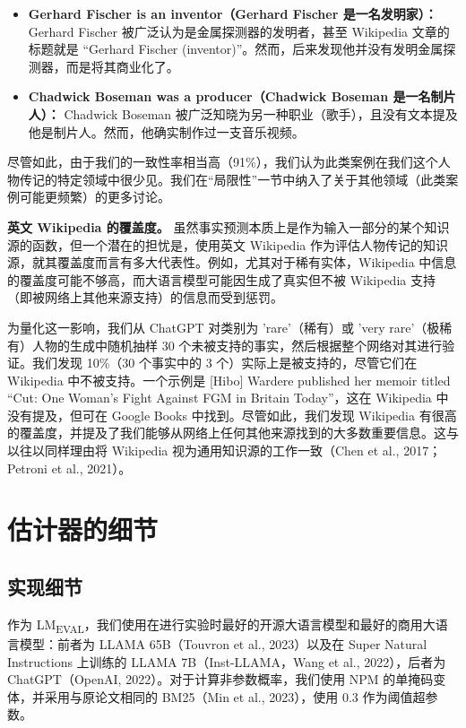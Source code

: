 \documentclass[11pt,UTF8,fontset=fandol]{ctexart}
\newcommand{\eval}{LM\textsubscript{EVAL}}
\begin{document}
\begin{itemize}[leftmargin=2em]
\item \textbf{Gerhard Fischer is an inventor（Gerhard Fischer 是一名发明家）：} Gerhard Fischer 被广泛认为是金属探测器的发明者，甚至 Wikipedia 文章的标题就是 “Gerhard Fischer (inventor)”。然而，后来发现他并没有发明金属探测器，而是将其商业化了。
\item \textbf{Chadwick Boseman was a producer（Chadwick Boseman 是一名制片人）：} Chadwick Boseman 被广泛知晓为另一种职业（歌手），且没有文本提及他是制片人。然而，他确实制作过一支音乐视频。
\end{itemize}

尽管如此，由于我们的一致性率相当高（91\%），我们认为此类案例在我们这个人物传记的特定领域中很少见。我们在“局限性”一节中纳入了关于其他领域（此类案例可能更频繁）的更多讨论。

\textbf{英文 Wikipedia 的覆盖度。} 虽然事实预测本质上是作为输入一部分的某个知识源的函数，但一个潜在的担忧是，使用英文 Wikipedia 作为评估人物传记的知识源，就其覆盖度而言有多大代表性。例如，尤其对于稀有实体，Wikipedia 中信息的覆盖度可能不够高，而大语言模型可能因生成了真实但不被 Wikipedia 支持（即被网络上其他来源支持）的信息而受到惩罚。

为量化这一影响，我们从 ChatGPT 对类别为 'rare'（稀有）或 'very rare'（极稀有）人物的生成中随机抽样 30 个未被支持的事实，然后根据整个网络对其进行验证。我们发现 10\%（30 个事实中的 3 个）实际上是被支持的，尽管它们在 Wikipedia 中不被支持。一个示例是 [Hibo] Wardere published her memoir titled ``Cut: One Woman's Fight Against FGM in Britain Today''，这在 Wikipedia 中没有提及，但可在 Google Books 中找到。尽管如此，我们发现 Wikipedia 有很高的覆盖度，并提及了我们能够从网络上任何其他来源找到的大多数重要信息。这与以往以同样理由将 Wikipedia 视为通用知识源的工作一致（Chen et al., 2017；Petroni et al., 2021）。

\section{估计器的细节}

\subsection{实现细节}

作为 \eval，我们使用在进行实验时最好的开源大语言模型和最好的商用大语言模型：前者为 LLAMA 65B（Touvron et al., 2023）以及在 Super Natural Instructions 上训练的 LLAMA 7B（Inst-LLAMA，Wang et al., 2022），后者为 ChatGPT（OpenAI, 2022）。对于计算非参数概率，我们使用 NPM 的单掩码变体，并采用与原论文相同的 BM25（Min et al., 2023），使用 0.3 作为阈值超参数。
\end{document}
